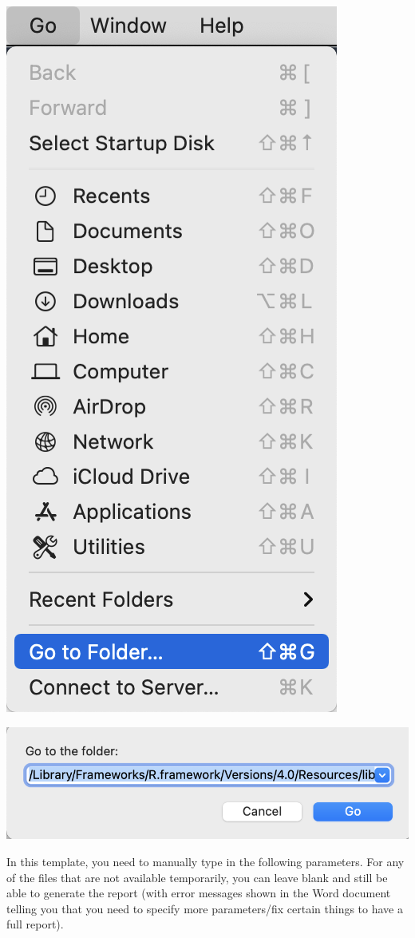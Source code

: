 \documentclass[
]{book}
\begin{document}
\begin{center}\includegraphics[width=0.66\linewidth]{images/go_to_folder1} \end{center}

\begin{center}\includegraphics[width=0.66\linewidth]{images/go_to_folder2} \end{center}

In this template, you need to manually type in the following parameters. For any of the files that are not available temporarily, you can leave blank and still be able to generate the report (with error messages shown in the Word document telling you that you need to specify more parameters/fix certain things to have a full report).
\end{document}
